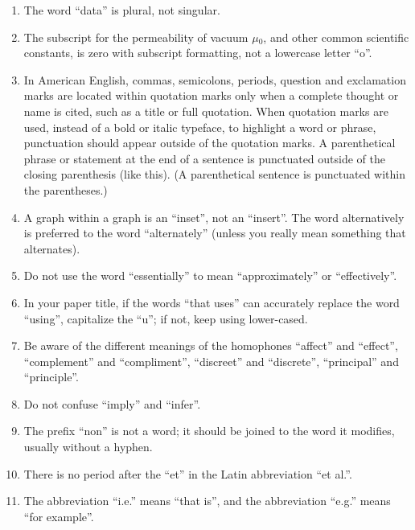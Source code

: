 \documentclass{article} %
\begin{document}
\begin{enumerate}
\item \textit{ }The word ``data'' is plural, not singular.

\item  The subscript for the permeability of vacuum \textit{$\mu$}${}_{0}$, and other common scientific constants, is zero with subscript formatting, not a lowercase letter ``o''.

\item  In American English, commas, semicolons, periods, question and exclamation marks are located within quotation marks only when a complete thought or name is cited, such as a title or full quotation. When quotation marks are used, instead of a bold or italic typeface, to highlight a word or phrase, punctuation should appear outside of the quotation marks. A parenthetical phrase or statement at the end of a sentence is punctuated outside of the closing parenthesis (like this). (A parenthetical sentence is punctuated within the parentheses.)

\item  A graph within a graph is an ``inset'', not an ``insert''. The word alternatively is preferred to the word ``alternately'' (unless you really mean something that alternates).

\item  Do not use the word ``essentially'' to mean ``approximately'' or ``effectively''.

\item  In your paper title, if the words ``that uses'' can accurately replace the word ``using'', capitalize the ``u''; if not, keep using lower-cased.

\item  Be aware of the different meanings of the homophones ``affect'' and ``effect'', ``complement'' and ``compliment'', ``discreet'' and ``discrete'', ``principal'' and ``principle''.

\item  Do not confuse ``imply'' and ``infer''.

\item  The prefix ``non'' is not a word; it should be joined to the word it modifies, usually without a hyphen.

\item  There is no period after the ``et'' in the Latin abbreviation ``et al.''.

\item  The abbreviation ``i.e.'' means ``that is'', and the abbreviation ``e.g.'' means ``for example''.
\end{enumerate}
\end{document}
